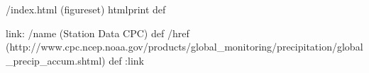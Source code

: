/index.html {(figureset) htmlprint} def
\begin{ingrid}
link:
/name (Station Data CPC) def
/href (http://www.cpc.ncep.noaa.gov/products/global_monitoring/precipitation/global_precip_accum.shtml) def
:link

\end{ingrid}
